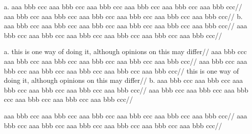 
%
%
%




\ex[glwidth=2.4in]
a.\quad
\begingl
\gla
aaa bbb ccc
aaa bbb ccc
aaa bbb ccc
aaa bbb ccc
aaa bbb ccc
aaa bbb ccc//
\glb
aaa bbb ccc
aaa bbb ccc
aaa bbb ccc
aaa bbb ccc
aaa bbb ccc
aaa bbb ccc//
\endgl
\hfil
b.\quad
\begingl
\gla
aaa bbb ccc
aaa bbb ccc
aaa bbb ccc
aaa bbb ccc
aaa bbb ccc
aaa bbb ccc//
\glb
aaa bbb ccc
aaa bbb ccc
aaa bbb ccc
aaa bbb ccc
aaa bbb ccc
aaa bbb ccc//
\endgl
\xe

\ex[glwidth=2.4in,glhangstyle=normal,glhangindent=1em,extraglskip=0pt]
a.\quad
\begingl
\glpreamble this is one way of doing it, although opinions on this
may differ//
\gla
aaa bbb ccc
aaa bbb ccc
aaa bbb ccc
aaa bbb ccc
aaa bbb ccc
aaa bbb ccc//
\glb
aaa bbb ccc
aaa bbb ccc
aaa bbb ccc
aaa bbb ccc
aaa bbb ccc
aaa bbb ccc//
\glft this is one way of doing it, although opinions on this
may differ//
\endgl
\hfil
b.\quad
\begingl
\gla
aaa bbb ccc
aaa bbb ccc
aaa bbb ccc
aaa bbb ccc
aaa bbb ccc
aaa bbb ccc//
\glb
aaa bbb ccc
aaa bbb ccc
aaa bbb ccc
aaa bbb ccc
aaa bbb ccc
aaa bbb ccc//
\endgl
\xe

\hsize=2in
\ex[glwidth=0pt,glhangstyle=cascade,glhangindent=1em]
\begingl
\gla
aaa bbb ccc
aaa bbb ccc
aaa bbb ccc
aaa bbb ccc
aaa bbb ccc
aaa bbb ccc//
\glb
aaa bbb ccc
aaa bbb ccc
aaa bbb ccc
aaa bbb ccc
aaa bbb ccc
aaa bbb ccc//
\endgl
\xe

\endinput

\ex
\begingl[glstyle=wrap,glwidth=0pt,glbreaking=false]
\gla
aaa bbb ccc
aaa bbb ccc
aaa bbb ccc
aaa bbb ccc
aaa bbb ccc
aaa bbb ccc
aaa bbb ccc
aaa bbb ccc
aaa bbb ccc
aaa bbb ccc
//
\glb
aaa bbb ccc
aaa bbb ccc
aaa bbb ccc
aaa bbb ccc
aaa bbb ccc
aaa bbb ccc
aaa bbb ccc
aaa bbb ccc
aaa bbb ccc
aaa bbb ccc
//
\endgl
\xe
